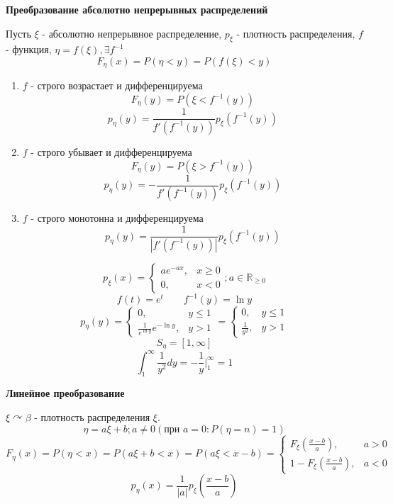 \noindent \textbf{Преобразование абсолютно непрерывных распределений}

Пусть $\xi$ - абсолютно непрерывное распределение, $p_\xi$ - плотность распределения, $f$ - функция, $\eta = f(\xi), \exists f^{-1}$
\[F_\eta(x)=P(\eta<y) = P(f(\xi)<y)\]
\begin{enumerate}
	\item $f$ - строго возрастает и дифференцируема
	\[F_\eta(y)=P(\xi < f^{-1}(y))\]
	\[p_\eta(y)=\dfrac{1}{f'(f^{-1}(y))}p_\xi(f^{-1}(y))\]
	\item $f$ - строго убывает и дифференцируема
	\[F_\eta(y)=P(\xi > f^{-1}(y))\]
	\[p_\eta(y)=-\dfrac{1}{f'(f^{-1}(y))}p_\xi(f^{-1}(y))\]
	\item $f$ - строго монотонна и дифференцируема
	\[p_\eta(y)=\dfrac{1}{|f'(f^{-1}(y))|}p_\xi(f^{-1}(y))\]
\end{enumerate}

\begin{exmp}
	\[
	p_{\xi} (x) =
	\begin{cases}
		ae^{-ax}, & x \ge 0 \\
		0, & x < 0
	\end{cases};
	a \in \mathbb{R}_{\ge 0}
	\]
	\[ f(t) = e^t ~~~~~~~~~ f^{-1} (y) = \ln y \]
	\[
	p_{\eta} (y) =
	\begin{cases}
		0, & y \le 1 \\
		\frac{1}{e^{\ln y}} e^{- \ln y}, & y > 1
	\end{cases}
	=
	\begin{cases}
		0, & y \le 1 \\
		\frac{1}{y^2}, & y > 1
	\end{cases}
	\]
	\[ S_{\eta} = [1, \infty] \]
	\[ \int_{1}^{\infty} \frac{1}{y^2} dy = - \frac{1}{y} \bigg|_{1}^{\infty} = 1 \]
\end{exmp}

\noindent \textbf{Линейное преобразование}

$\xi \curvearrowright \beta$ - плотность распределения $\xi$.
\[ \eta = a \xi + b; a \ne 0 (\text{при } a = 0: P(\eta = n) = 1) \]
\[
	F_{\eta} (x) = P(\eta < x) = P(a \xi + b < x) = P(a \xi < x - b) =
	\begin{cases}
		F_{\xi} \left( \frac{x - b}{a} \right), & a > 0 \\
		1 - F_{\xi} \left( \frac{x - b}{a} \right), & a < 0
	\end{cases}
\]
\[ p_{\eta} (x) = \frac{1}{|a|} p_{\xi} \left( \frac{x - b}{a} \right) \]

